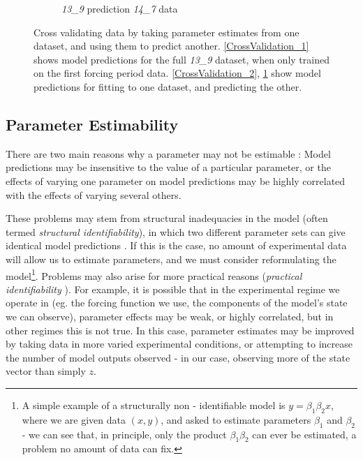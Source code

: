 \documentclass[10pt,journal]{./IEEE_latex_class/IEEEtran}
\begin{document}
\begin{figure}[h!]
\begin{subfigure}[h]{0.49\textwidth}
        \caption{\textit{13\_9} prediction \textit{14\_7} data}
        \label{CrossValidation_3} 
    \end{subfigure}
    \caption{Cross validating data by taking parameter estimates from one dataset, and using them to predict another. \ref{CrossValidation_1} shows model predictions for the full \textit{13\_9} dataset, when only trained on the first forcing period data. \ref{CrossValidation_2}, \ref{CrossValidation_3} show model predictions for fitting to one dataset, and predicting the other.}
\label{CrossValidation}
\vspace{-5mm}   
\end{figure}

 
 \subsection{Parameter Estimability}
\label{Parameter Estimability}
 
 There are two main reasons why a parameter may not be estimable \cite{Mclean2012,Yao2003, Beck,Jimenez-Hornero2008,Grewal1976}: Model predictions may be insensitive to the value of a particular parameter, or the effects of varying one parameter on model predictions may be highly correlated with the effects of varying several others.
 
These problems may stem from structural inadequacies in the model (often termed \textit{structural identifiability}), in which two different parameter sets can give identical model predictions \cite{Jimenez-Hornero2008,Grewal1976 }. If this is the case, no amount of experimental data will allow us to estimate parameters, and we must consider reformulating the model\footnote{A simple example of a structurally non - identifiable model is $y = \beta_{1}\beta_{2}x$, where we are given data $(x,y)$, and asked to estimate parameters $\beta_{1}$ and $\beta_{2}$ - we can see that, in principle, only the product $\beta_{1}\beta_{2}$ can ever be estimated, a problem no amount of data can fix.}. Problems may also arise for more practical reasons (\textit{practical identifiability} \cite{Mclean2012}). For example, it is possible that in the experimental regime we operate in (eg. the forcing function we use, the components of the model's state we can observe), parameter effects may be weak, or highly correlated, but in other regimes this is not true. In this case, parameter estimates may be improved by taking data in more varied experimental conditions, or attempting to increase the number of model outputs observed - in our case, observing more of the state vector than simply $z$. 
 
\end{document}
